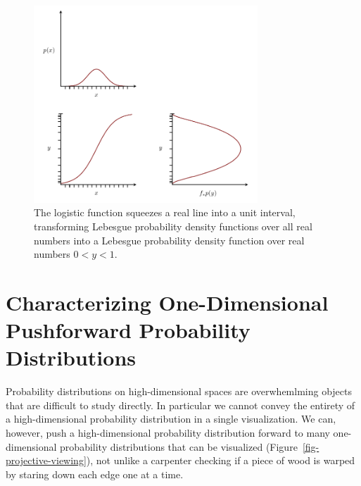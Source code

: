 \documentclass[
  letterpaper,
  DIV=11,
  numbers=noendperiod]{scrartcl}
\begin{document}
\begin{figure}

{\centering \includegraphics[width=0.75\textwidth,height=\textheight]{figures/pushforwards_density_functions/logistic/logistic.pdf}

}

\caption{\label{fig-logistic}The logistic function squeezes a real line
into a unit interval, transforming Lebesgue probability density
functions over all real numbers into a Lebesgue probability density
function over real numbers \(0 < y < 1\).}

\end{figure}

\hypertarget{sec:1d-pushforward-characterizations}{%
\section{Characterizing One-Dimensional Pushforward Probability
Distributions}\label{sec:1d-pushforward-characterizations}}

Probability distributions on high-dimensional spaces are overwhemlming
objects that are difficult to study directly. In particular we cannot
convey the entirety of a high-dimensional probability distribution in a
single visualization. We can, however, push a high-dimensional
probability distribution forward to many one-dimensional probability
distributions that can be visualized
(Figure~\ref{fig-projective-viewing}), not unlike a carpenter checking
if a piece of wood is warped by staring down each edge one at a time.
\end{document}
